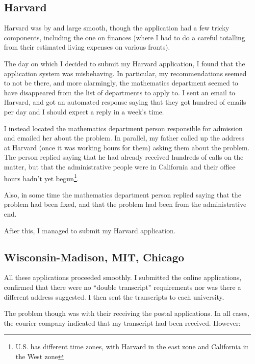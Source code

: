 \documentclass[a4paper]{amsart}
\begin{document}
\subsection{Harvard}

Harvard was by and large smooth, though the application had a few
tricky components, including the one on finances (where I had to do a
careful totalling from their estimated living expenses on various
fronts).

The day on which I decided to submit my Harvard application, I found
that the application system was misbehaving. In particular, my
recommendations seemed to not be there, and more alarmingly, the
mathematics department seemed to have disappeared from the list of
departments to apply to. I sent an email to Harvard, and got an
automated response saying that they got hundred of emails per day and
I should expect a reply in a week's time.

I instead located the mathematics department person responsible for
admission and emailed her about the problem. In parallel, my father
called up the address at Harvard (once it was working hours for them)
asking them about the problem. The person replied saying that he had
already received hundreds of calls on the matter, but that the
administrative people were in California and their office hours hadn't
yet begun\footnote{U.S. has different time zones, with Harvard in the east zone and California in the West zone}.

Also, in some time the mathematics department person replied saying that the problem had been fixed, and that the problem had been from the administrative end.

After this, I managed to submit my Harvard application.

\subsection{Wisconsin-Madison, MIT, Chicago}

All these applications proceeded smoothly. I submitted the online applications,
confirmed that there were no ``double transcript'' requirements nor was 
there a different address suggested. I then sent the transcripts
to each university.

The problem though was with their receiving the postal applications.
In all cases, the courier company indicated that my transcript had
been received. However:
\end{document}
